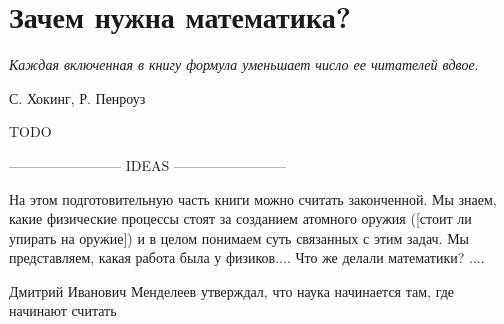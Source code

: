 \chapter{Зачем нужна математика?}

\epigraph{\emph{Каждая включенная в книгу формула \break уменьшает число ее читателей вдвое}.}{С. Хокинг, Р. Пенроуз}

TODO

------------------------ IDEAS ------------------------ 

На этом подготовительную часть книги можно считать законченной.
Мы знаем, какие физические процессы стоят за созданием атомного оружия ([стоит ли упирать на оружие]) и в целом понимаем суть связанных с этим задач.
Мы представляем, какая работа была у физиков....
Что же делали математики? ....


Дмитрий Иванович Менделеев утверждал, что наука начинается там, где начинают считать
